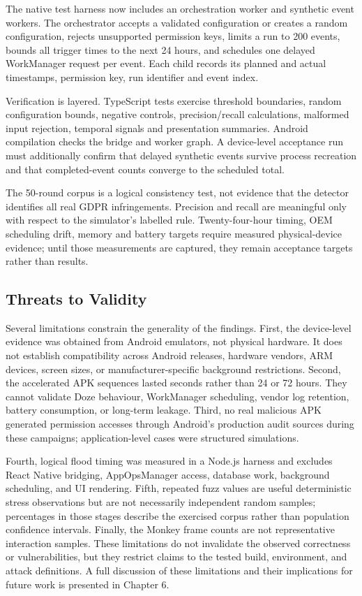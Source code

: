 The native test harness now includes an orchestration worker and synthetic event workers. The orchestrator accepts a validated configuration or creates a random configuration, rejects unsupported permission keys, limits a run to 200 events, bounds all trigger times to the next 24 hours, and schedules one delayed WorkManager request per event. Each child records its planned and actual timestamps, permission key, run identifier and event index.

Verification is layered. TypeScript tests exercise threshold boundaries, random configuration bounds, negative controls, precision/recall calculations, malformed input rejection, temporal signals and presentation summaries. Android compilation checks the bridge and worker graph. A device-level acceptance run must additionally confirm that delayed synthetic events survive process recreation and that completed-event counts converge to the scheduled total.

The 50-round corpus is a logical consistency test, not evidence that the detector identifies all real GDPR infringements. Precision and recall are meaningful only with respect to the simulator's labelled rule. Twenty-four-hour timing, OEM scheduling drift, memory and battery targets require measured physical-device evidence; until those measurements are captured, they remain acceptance targets rather than results.

\subsection{Threats to Validity}

Several limitations constrain the generality of the findings. First, the device-level evidence was obtained from Android emulators, not physical hardware. It does not establish compatibility across Android releases, hardware vendors, ARM devices, screen sizes, or manufacturer-specific background restrictions. Second, the accelerated APK sequences lasted seconds rather than 24 or 72 hours. They cannot validate Doze behaviour, WorkManager scheduling, vendor log retention, battery consumption, or long-term leakage. Third, no real malicious APK generated permission accesses through Android's production audit sources during these campaigns; application-level cases were structured simulations.

Fourth, logical flood timing was measured in a Node.js harness and excludes React Native bridging, AppOpsManager access, database work, background scheduling, and UI rendering. Fifth, repeated fuzz values are useful deterministic stress observations but are not necessarily independent random samples; percentages in those stages describe the exercised corpus rather than population confidence intervals. Finally, the Monkey frame counts are not representative interaction samples. These limitations do not invalidate the observed correctness or vulnerabilities, but they restrict claims to the tested build, environment, and attack definitions. A full discussion of these limitations and their implications for future work is presented in Chapter 6.

